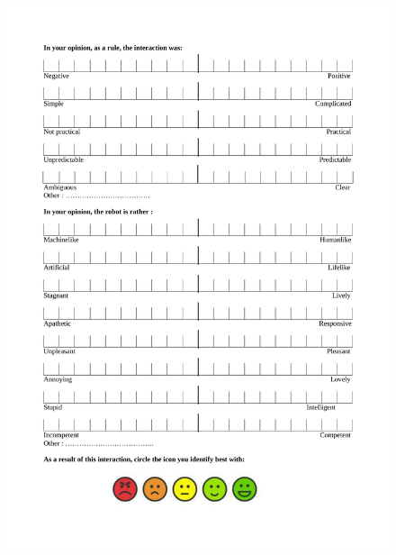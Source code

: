 \begin{figure}[!h]
	\centering
    \includegraphics[width=\textwidth]{figs/Chapter5/Questionnaire_english2.pdf}
    \caption{}
    \label{fig:Questionnaire_english}
\end{figure}

